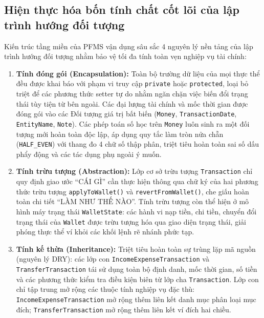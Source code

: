 \documentclass[a4paper,12pt]{report}
\newcommand{\passthrough}[1]{#1}
\begin{document}
\subsection{Hiện thực hóa bốn tính chất cốt lõi của lập trình hướng đối
tượng}\label{hiux1ec7n-thux1ef1c-huxf3a-bux1ed1n-tuxednh-chux1ea5t-cux1ed1t-luxf5i-cux1ee7a-lux1eadp-truxecnh-hux1b0ux1edbng-ux111ux1ed1i-tux1b0ux1ee3ng}

Kiến trúc tầng miền của PFMS vận dụng sâu sắc 4 nguyên lý nền tảng của lập trình hướng đối tượng nhằm bảo vệ tối đa tính toàn vẹn nghiệp vụ tài chính:

\begin{enumerate}
\def\labelenumi{\arabic{enumi}.}
\item
  \textbf{Tính đóng gói (Encapsulation):} Toàn bộ trường dữ liệu của mọi thực thể đều được khai báo với phạm vi truy cập \passthrough{\lstinline!private!} hoặc \passthrough{\lstinline!protected!}, loại bỏ triệt để các phương thức setter tự do nhằm ngăn chặn việc biến đổi trạng thái tùy tiện từ bên ngoài. Các đại lượng tài chính và mốc thời gian được đóng gói vào các Đối tượng giá trị bất biến (\passthrough{\lstinline!Money!}, \passthrough{\lstinline!TransactionDate!}, \passthrough{\lstinline!EntityName!}, \passthrough{\lstinline!Note!}). Các phép toán số học trên \passthrough{\lstinline!Money!} luôn sinh ra một đối tượng mới hoàn toàn độc lập, áp dụng quy tắc làm tròn nửa chẵn (\passthrough{\lstinline!HALF_EVEN!}) với thang đo 4 chữ số thập phân, triệt tiêu hoàn toàn sai số dấu phẩy động và các tác dụng phụ ngoài ý muốn.
\item
  \textbf{Tính trừu tượng (Abstraction):} Lớp cơ sở trừu tượng \passthrough{\lstinline!Transaction!} chỉ quy định giao ước ``CÁI GÌ'' cần thực hiện thông qua chữ ký của hai phương thức trừu tượng \passthrough{\lstinline!applyToWallet()!} và \passthrough{\lstinline!revertFromWallet()!}, che giấu hoàn toàn chi tiết ``LÀM NHƯ THẾ NÀO''. Tính trừu tượng còn thể hiện ở mô hình máy trạng thái \passthrough{\lstinline!WalletState!}: các hành vi nạp tiền, chi tiền, chuyển đổi trạng thái của \passthrough{\lstinline!Wallet!} được trừu tượng hóa qua giao diện trạng thái, giải phóng thực thể ví khỏi các khối lệnh rẽ nhánh phức tạp.
\item
  \textbf{Tính kế thừa (Inheritance):} Triệt tiêu hoàn toàn sự trùng lặp mã nguồn (nguyên lý DRY): các lớp con \passthrough{\lstinline!IncomeExpenseTransaction!} và \passthrough{\lstinline!TransferTransaction!} tái sử dụng toàn bộ định danh, mốc thời gian, số tiền và các phương thức kiểm tra điều kiện biên từ lớp cha \passthrough{\lstinline!Transaction!}. Lớp con chỉ tập trung mở rộng các thuộc tính nghiệp vụ đặc thù: \passthrough{\lstinline!IncomeExpenseTransaction!} mở rộng thêm liên kết danh mục phân loại mục đích; \passthrough{\lstinline!TransferTransaction!} mở rộng thêm liên kết ví đích hai chiều.

\end{enumerate}
\end{document}
